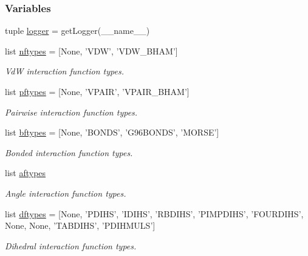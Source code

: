 \subsubsection*{Variables}
\begin{DoxyCompactItemize}
\item 
tuple \hyperlink{namespaceforcebalance_1_1gmxio_ac10457054444ca04e0a265665afc2512}{logger} = get\-Logger(\-\_\-\-\_\-name\-\_\-\-\_\-)
\item 
list \hyperlink{namespaceforcebalance_1_1gmxio_a337bc61280b58a43319380dec9c5529a}{nftypes} = \mbox{[}None, 'V\-D\-W', 'V\-D\-W\-\_\-\-B\-H\-A\-M'\mbox{]}
\begin{DoxyCompactList}\small\item\em Vd\-W interaction function types. \end{DoxyCompactList}\item 
list \hyperlink{namespaceforcebalance_1_1gmxio_a59695b79df36efbe64ac88fd64bfb366}{pftypes} = \mbox{[}None, 'V\-P\-A\-I\-R', 'V\-P\-A\-I\-R\-\_\-\-B\-H\-A\-M'\mbox{]}
\begin{DoxyCompactList}\small\item\em Pairwise interaction function types. \end{DoxyCompactList}\item 
list \hyperlink{namespaceforcebalance_1_1gmxio_a49a34b85d405c9286ceec1e6f088069f}{bftypes} = \mbox{[}None, 'B\-O\-N\-D\-S', 'G96\-B\-O\-N\-D\-S', 'M\-O\-R\-S\-E'\mbox{]}
\begin{DoxyCompactList}\small\item\em Bonded interaction function types. \end{DoxyCompactList}\item 
list \hyperlink{namespaceforcebalance_1_1gmxio_aef89ff391902f81feb14e28ec301296c}{aftypes}
\begin{DoxyCompactList}\small\item\em Angle interaction function types. \end{DoxyCompactList}\item 
list \hyperlink{namespaceforcebalance_1_1gmxio_acd9fed3887161c6386506563fd4f3534}{dftypes} = \mbox{[}None, 'P\-D\-I\-H\-S', 'I\-D\-I\-H\-S', 'R\-B\-D\-I\-H\-S', 'P\-I\-M\-P\-D\-I\-H\-S', 'F\-O\-U\-R\-D\-I\-H\-S', None, None, 'T\-A\-B\-D\-I\-H\-S', 'P\-D\-I\-H\-M\-U\-L\-S'\mbox{]}
\begin{DoxyCompactList}\small\item\em Dihedral interaction function types. \end{DoxyCompactList}\item 

\end{DoxyCompactItemize}
